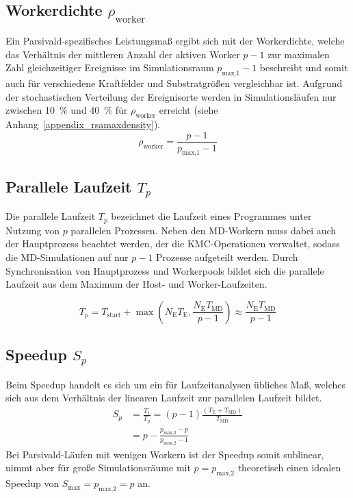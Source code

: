 \subsection{Workerdichte \texorpdfstring{$\rho_\text{worker}$}{rhoworker}}

Ein Parsivald-spezifisches Leistungsmaß ergibt sich mit der Workerdichte, welche das Verhältnis der mittleren Anzahl der aktiven Worker $p-1$ zur maximalen Zahl gleichzeitiger Ereignisse im Simulationsraum $p_\text{max,1}-1$ beschreibt und somit auch für verschiedene Kraftfelder und Substratgrößen vergleichbar ist.
Aufgrund der stochastischen Verteilung der Ereignisorte werden in Simulationsläufen nur zwischen \SI{10}{\percent} und \SI{40}{\percent} für $\rho_\text{worker}$ erreicht (siehe Anhang~\ref{appendix_rsamaxdensity}).
\begin{equation}
  \rho_\text{worker} = \frac{p - 1}{p_\text{max,1} - 1}
  \label{eq:workerdensity}
\end{equation}

\subsection{Parallele Laufzeit \texorpdfstring{$T_p$}{Tp}}

Die parallele Laufzeit $T_p$ bezeichnet die Laufzeit eines Programmes unter Nutzung von $p$ parallelen Prozessen.
Neben den MD-Workern muss dabei auch der Hauptprozess beachtet werden, der die KMC-Operationen verwaltet, sodass die MD-Simulationen auf nur $p-1$ Prozesse aufgeteilt werden.
Durch Synchronisation von Hauptprozess und Workerpools bildet sich die parallele Laufzeit aus dem Maximum der Host- und Worker-Laufzeiten.

\begin{equation}
  T_p = T_\text{start} + \max\left(N_\text{E} T_\text{E}, \frac{N_\text{E} T_\text{MD}}{p-1}\right) \approx \frac{N_\text{E} T_\text{MD}}{p-1}
  \label{eq:runtime}
\end{equation}

\subsection{Speedup \texorpdfstring{$S_p$}{Sp}}

Beim Speedup handelt es sich um ein für Laufzeitanalysen übliches Maß, welches sich aus dem Verhältnis der linearen Laufzeit zur parallelen Laufzeit bildet.
\begin{align}
  S_p & = \frac{T_1}{T_p} = \left(p-1\right) \frac{\left(T_\text{E} + T_\text{MD}\right)}{T_\text{MD}} \\
      & = p - \frac{p_\text{max,2} - p}{p_\text{max,2} - 1}
\end{align}
Bei Parsivald-Läufen mit wenigen Workern ist der Speedup somit sublinear, nimmt aber für große Simulationsräume mit $p = p_\text{max,2}$ theoretisch einen idealen Speedup von $S_\text{max} = p_\text{max,2} = p$ an.

